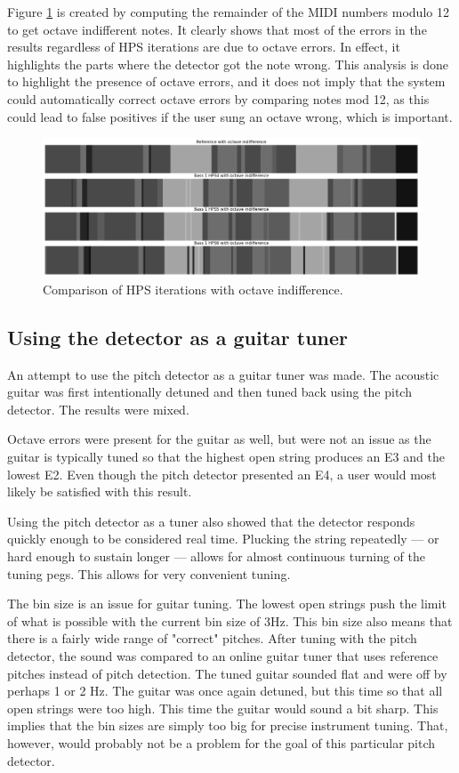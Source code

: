 Figure \ref{fig:hpsOctaveErrors} is created by computing the remainder of the MIDI numbers modulo 12 to get octave indifferent notes. It clearly shows that most of the errors in the results regardless of HPS iterations are due to octave errors. In effect, it highlights the parts where the detector got the note wrong. This analysis is done to highlight the presence of octave errors, and it does not imply that the system could automatically correct octave errors by comparing notes mod 12, as this could lead to false positives if the user sung an octave wrong, which is important.

\begin{figure}[ht]
    \centering
    \includegraphics[width=\textwidth]{./images/hpsOctaveErrors.png}
    \caption{Comparison of HPS iterations with octave indifference. \label{fig:hpsOctaveErrors}}
\end{figure}


\subsection{Using the detector as a guitar tuner}
An attempt to use the pitch detector as a guitar tuner was made. The acoustic guitar was first intentionally detuned and then tuned back using the pitch detector. The results were mixed.

Octave errors were present for the guitar as well, but were not an issue as the guitar is typically tuned so that the highest open string produces an E3 and the lowest E2. Even though the pitch detector presented an E4, a user would most likely be satisfied with this result.

Using the pitch detector as a tuner also showed that the detector responds quickly enough to be considered real time. Plucking the string repeatedly — or hard enough to sustain longer — allows for almost continuous turning of the tuning pegs. This allows for very convenient tuning.

The bin size is an issue for guitar tuning. The lowest open strings push the limit of what is possible with the current bin size of 3Hz. This bin size also means that there is a fairly wide range of "correct" pitches. After tuning with the pitch detector, the sound was compared to an online guitar tuner that uses reference pitches instead of pitch detection. The tuned guitar sounded flat and were off by perhaps 1 or 2 Hz. The guitar was once again detuned, but this time so that all open strings were too high. This time the guitar would sound a bit sharp. This implies that the bin sizes are simply too big for precise instrument tuning. That, however, would probably not be a problem for the goal of this particular pitch detector. 

